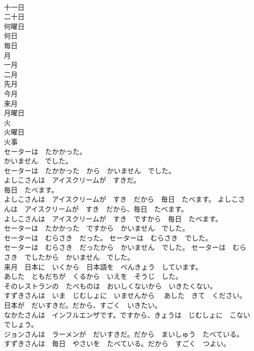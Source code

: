 \documentclass[8pt]{extreport}
\begin{document}
\begin{CJK}{UTF8}{min}
\\	十一日	
\\	二十日	
\\	何曜日	
\\	何日	
\\	毎日	
\\	月	
\\	一月	
\\	二月	
\\	先月	
\\	今月	
\\	来月	
\\	月曜日	
\\	火	
\\	火曜日	
\\	火事	
\\	セーターは　たかかった。	
\\	かいません　でした。	
\\	セーターは　たかかった　から　かいません　でした。	
\\	よしこさんは　アイスクリームが　すきだ。	
\\	毎日　たべます。	
\\	よしこさんは　アイスクリームが　すき　だから　毎日　たべます。 よしこさんは　アイスクリームが　すき　だから、毎日　たべます。	
\\	よしこさんは　アイスクリームが　すき　ですから　毎日　たべます。	
\\	セーターは　たかかった　ですから　かいません　でした。	
\\	セーターは　むらさき　だった。 セーターは　むらさき　でした。	
\\	セーターは　むらさき　だったから　かいません　でした。 セーターは　むらさき　でしたから　かいません　でした。	
\\	来月　日本に　いくから　日本語を　べんきょう　しています。	
\\	あした　ともだちが　くるから　いえを　そうじ　した。	
\\	そのレストランの　たべものは　おいしくないから　いきたくない。	
\\	すずきさんは　いま　じむしょに　いませんから 　あした　きて　ください。	
\\	日本が　だいすきだ。だから、すごく　いきたい。	
\\	なかたさんは　インフルエンザです。ですから、きょうは　じむしょに　こない　でしょう。	
\\	ジョンさんは　ラーメンが　だいすきだ。だから　まいしゅう　たべている。	
\\	すずきさんは　毎日　やさいを　たべている。だから　すごく　つよい。	

\end{CJK}
\end{document}
